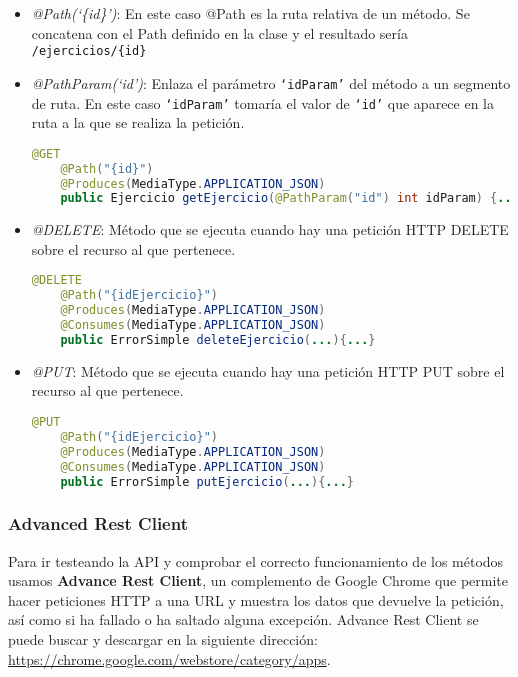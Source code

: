 \begin{itemize}
\item \textit{@Path(`\{id\}')}: En este caso @Path es la ruta relativa de un método. Se concatena con el Path definido en la clase y el resultado sería \texttt{/ejercicios/\{id\}}
\item \textit{@PathParam(`id')}: Enlaza el parámetro \texttt{`idParam'} del método a un segmento de ruta. En este caso \texttt{`idParam'} tomaría el valor de \texttt{`id'} que aparece en la ruta a la que se realiza la petición.

\vspace{1em}
{\codesize
\lstset{}
\begin{lstlisting}[frame=single, language=java]
    @GET
    @Path("{id}")
    @Produces(MediaType.APPLICATION_JSON)
    public Ejercicio getEjercicio(@PathParam("id") int idParam) {...}
\end{lstlisting}
}
\vspace{1em}


\item \textit{@DELETE}: Método que se ejecuta cuando hay una petición HTTP DELETE sobre el recurso al que pertenece.

\vspace{1em}
{\codesize
\lstset{}
\begin{lstlisting}[frame=single, language=java]
    @DELETE
    @Path("{idEjercicio}")
    @Produces(MediaType.APPLICATION_JSON)
    @Consumes(MediaType.APPLICATION_JSON)
    public ErrorSimple deleteEjercicio(...){...}
\end{lstlisting}
}
\vspace{1em}


\item \textit{@PUT}: Método que se ejecuta cuando hay una petición HTTP PUT sobre el recurso al que pertenece.


\vspace{1em}
{\codesize
\lstset{}
\begin{lstlisting}[frame=single, language=java]
    @PUT
    @Path("{idEjercicio}")
    @Produces(MediaType.APPLICATION_JSON)
    @Consumes(MediaType.APPLICATION_JSON)
    public ErrorSimple putEjercicio(...){...}
\end{lstlisting}
}
\vspace{1em}

\end{itemize}

\subsubsection{Advanced Rest Client}
Para ir testeando la API y comprobar el correcto funcionamiento de los métodos usamos \textbf{Advance Rest Client}, un complemento de Google Chrome que permite hacer peticiones HTTP a una URL y muestra los datos que devuelve la petición, así como si ha fallado o ha saltado alguna excepción. Advance Rest Client se puede buscar y descargar en la siguiente dirección:
 \url{https://chrome.google.com/webstore/category/apps}.
 
